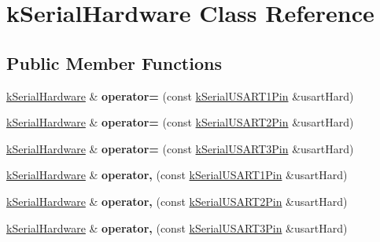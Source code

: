 \hypertarget{classkSerialHardware}{}\section{k\+Serial\+Hardware Class Reference}
\label{classkSerialHardware}
\subsection*{Public Member Functions}
\begin{DoxyCompactItemize}
\item 
\hyperlink{classkSerialHardware}{k\+Serial\+Hardware} \& {\bfseries operator=} (const \hyperlink{structkSerialUSART1Pin}{k\+Serial\+U\+S\+A\+R\+T1\+Pin} \&usart\+Hard)\hypertarget{classkSerialHardware_aee95694dece43bee1cf86777bfd8db56}{}\label{classkSerialHardware_aee95694dece43bee1cf86777bfd8db56}

\item 
\hyperlink{classkSerialHardware}{k\+Serial\+Hardware} \& {\bfseries operator=} (const \hyperlink{structkSerialUSART2Pin}{k\+Serial\+U\+S\+A\+R\+T2\+Pin} \&usart\+Hard)\hypertarget{classkSerialHardware_a5d03fcf9a0624b02c820833dd313c8c2}{}\label{classkSerialHardware_a5d03fcf9a0624b02c820833dd313c8c2}

\item 
\hyperlink{classkSerialHardware}{k\+Serial\+Hardware} \& {\bfseries operator=} (const \hyperlink{structkSerialUSART3Pin}{k\+Serial\+U\+S\+A\+R\+T3\+Pin} \&usart\+Hard)\hypertarget{classkSerialHardware_ac8fb37e3a0ee5f06c2c7b5011f9043e1}{}\label{classkSerialHardware_ac8fb37e3a0ee5f06c2c7b5011f9043e1}

\item 
\hyperlink{classkSerialHardware}{k\+Serial\+Hardware} \& {\bfseries operator,} (const \hyperlink{structkSerialUSART1Pin}{k\+Serial\+U\+S\+A\+R\+T1\+Pin} \&usart\+Hard)\hypertarget{classkSerialHardware_a0362350b65cd40feb8f108f2642bbf94}{}\label{classkSerialHardware_a0362350b65cd40feb8f108f2642bbf94}

\item 
\hyperlink{classkSerialHardware}{k\+Serial\+Hardware} \& {\bfseries operator,} (const \hyperlink{structkSerialUSART2Pin}{k\+Serial\+U\+S\+A\+R\+T2\+Pin} \&usart\+Hard)\hypertarget{classkSerialHardware_a86ecf424b053f64478ae27350880ed40}{}\label{classkSerialHardware_a86ecf424b053f64478ae27350880ed40}

\item 
\hyperlink{classkSerialHardware}{k\+Serial\+Hardware} \& {\bfseries operator,} (const \hyperlink{structkSerialUSART3Pin}{k\+Serial\+U\+S\+A\+R\+T3\+Pin} \&usart\+Hard)\hypertarget{classkSerialHardware_ac0449d5018faac5cf3848a8d4ef97e9f}{}\label{classkSerialHardware_ac0449d5018faac5cf3848a8d4ef97e9f}

\end{DoxyCompactItemize}
